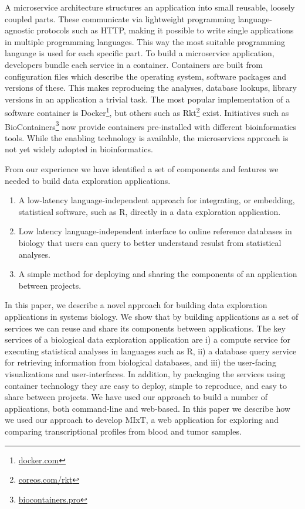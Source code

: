 A microservice architecture structures an application into small reusable,
loosely coupled parts. These communicate via lightweight programming
language-agnostic protocols such as HTTP, making it possible to write single
applications in multiple programming languages. This way the
most suitable programming language is used for each specific part. To build a
microservice application, developers bundle each service in a container.
Containers are built from configuration files which describe the operating
system, software packages and versions of these. 
This makes reproducing the analyses, database lookups, library versions in an
application a trivial task. The most popular implementation of a software
container is Docker\footnote{\url{docker.com}}, but others such as
Rkt\footnote{\url{coreos.com/rkt}} exist. Initiatives such as
BioContainers\footnote{\url{biocontainers.pro}} now provide containers
pre-installed with different bioinformatics tools. While the enabling technology
is available, the microservices approach is not yet widely adopted in
bioinformatics.\cite{williams2016growing}

From our experience we have identified a set of components and features we
needed to build data exploration applications.

\begin{enumerate}
    \item A low-latency language-independent approach for integrating, or
        embedding, statistical software, such as R, directly in a data
        exploration application. 
    \item Low latency language-independent interface to online reference
        databases in biology that users can query to better understand resulst
        from statistical analyses. 
    \item A simple method for deploying and sharing the components of an
        application between projects. 
\end{enumerate} 


In this paper, we describe a novel approach for building data exploration
applications in systems biology. 
We show that by building applications as a set
of services we can reuse and share its components between applications. 
The key services of a biological data exploration application are i) a compute
service for executing statistical analyses in languages such as R, ii) a
database query service for retrieving information from biological databases, and
iii) the user-facing visualizations and user-interfaces. 
In addition, by packaging the services using container technology they are easy
to deploy, simple to reproduce, and easy to share between projects. 
We have used our approach to build a number of applications, both command-line
and web-based. In this paper we describe how we used our approach to develop
MIxT, a web application for exploring and comparing transcriptional profiles
from blood and tumor samples. 
